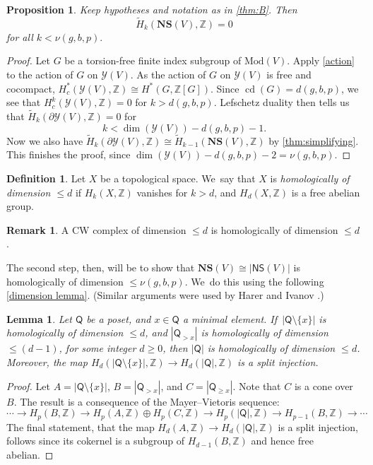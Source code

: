 \documentclass[JEP,XML,SOM,Unicode,NoFloatCountersInSection,published]{cedram}
\theoremstyle{plain}
\newtheorem{lem}[thm]{Lemma}
\newtheorem{prop}[thm]{Proposition}
\theoremstyle{definition}
\newtheorem{rem}[thm]{Remark}
\newtheorem{defn}[thm]{Definition}
\newcommand{\Y}{\mathcal Y}
\newcommand{\Z}{\mathbb Z}
\newcommand{\NS}{\mathsf{NS}}
\newcommand{\compNS}{\mathbf{NS}}
\newcommand{\hmod}{\mathrm{Mod}}
\begin{document}
\begin{prop}\label{high connectivity} Keep hypotheses and notation as in \cref{thm:B}. Then
\[
\widetilde H_k(\compNS(V),\Z)=0
\]
for all $k<\nu(g,b,p).$
\end{prop}

\begin{proof}Let $G$ be a torsion-free finite index subgroup of $\hmod(V)$. Apply \cref{action} to the action of $G$ on $\Y(V)$. As the action of $G$ on $\Y(V)$ is free and cocompact, $H^*_c(\Y(V),\mathbb{Z})\cong H^*(G,\mathbb{Z}[G])$. Since $\operatorname{cd}(G)=d(g,b,p)$, we see that $H^k_c(\Y(V),\mathbb{Z})=0$ for $k>d(g,b,p)$. Lefschetz duality then tells us that $\widetilde H_k(\partial \Y(V),\Z)=0$ for
\[
k<\dim(\Y(V))-d(g,b,p)-1.
\]
Now we also have $\widetilde H_k(\partial \Y(V),\Z) \cong \widetilde H_{k-1}(\compNS(V),\Z)$ by \cref{thm:simplifying}. This finishes the proof, since $\dim(\Y(V)) - d(g,b,p)-2=\nu(g,b,p).$
\end{proof}

\begin{defn}Let $X$ be a topological space. We~say that $X$ is \emph{homologically of dimension $\leq d$} if $H_k(X,\Z)$ vanishes for $k>d$, and $H_d(X,\Z)$ is a free abelian group.\end{defn}

\begin{rem}
A CW complex of dimension $\leq d$ is homologically of dimension $\leq d$.
\end{rem}

The second step, then, will be to show that $\compNS(V) \cong |\NS(V)|$ is homologically of dimension $\leq \nu(g,b,p)$. We~do this using the following \cref{dimension lemma}. (Similar arguments were used by Harer \cite{harer} and Ivanov \cite{ivanov}.)

\begin{lem}\label{MV lemma}Let $\mathsf Q$ be a poset, and $x \in \mathsf Q$ a minimal element. If~$|\mathsf Q \setminus \{x\}|$ is homologically of dimension $\leq d$, and $|\mathsf Q_{>x}|$ is homologically of dimension $\leq (d-1)$, for some integer $d \geq 0$, then $|\mathsf Q|$ is homologically of dimension $\leq d$. Moreover, the map $H_d(|\mathsf Q \setminus \{x\}|,\Z)\to H_d(|\mathsf Q|,\Z)$ is a split injection.
\end{lem}

\begin{proof}
Let $A = |\mathsf Q \setminus \{x\}|$, $B = |\mathsf Q_{>x}|$, and $C = |\mathsf Q_{\geq x}|$. Note that $C$ is a cone over~$B$. The result is a consequence of the Mayer--Vietoris sequence:
\[
\cdots
\to H_p(B,\Z) \to H_p(A,\Z) \oplus H_p(C,\Z) \to H_p(|\mathsf Q|,\Z) \to H_{p-1}(B,\Z) \to \cdots
\]The final statement, \ie that the map $H_d(A,\Z)\to H_d(|\mathsf Q|,\Z)$ is a split injection, follows since its cokernel is a subgroup of $H_{d-1}(B,\Z)$ and hence free abelian.\end{proof}
\end{document}

